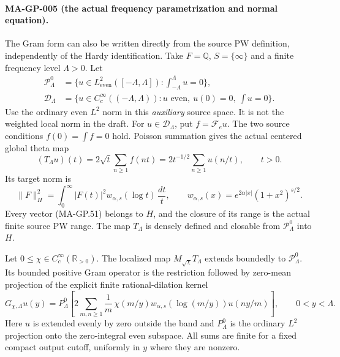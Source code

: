 \paragraph{MA-GP-005 (the actual frequency parametrization and normal equation).}
The Gram form can also be written directly from the source
PW definition, independently of the Hardy identification.
Take $F=\mathbb Q$, $S=\{\infty\}$ and a finite frequency
level $\Lambda>0$.  Let
\[
 \begin{aligned}
 \mathcal P_\Lambda^0
   &=\{u\in L^2_{\mathrm{even}}([-\Lambda,\Lambda]):
                                       \int_{-\Lambda}^{\Lambda}u=0\},\\
 \mathscr D_\Lambda
   &=\{u\in C_c^\infty((-\Lambda,\Lambda)):
                      u\text{ even},\ u(0)=0,\ \int u=0\}.
 \end{aligned}
 \tag{MA-GP.50}
\]
Use the ordinary even $L^2$ norm in this \emph{auxiliary}
source space.  It is not the weighted local norm in the draft.
For $u\in\mathscr D_\Lambda$, put $f=\mathcal F_eu$.
The two source conditions $f(0)=\int f=0$ hold.
Poisson summation gives the actual centered global theta map
\[
 (T_\Lambda u)(t)
       =2\sqrt t\sum_{n\ge1}f(nt)
       =2t^{-1/2}\sum_{n\ge1}u(n/t),\qquad t>0.
 \tag{MA-GP.51}
\]
Its target norm is
\[
 \|F\|_H^2=\int_0^\infty|F(t)|^2
           w_{\alpha,s}(\log t)\,\frac{dt}{t},
 \qquad w_{\alpha,s}(x)=e^{2\alpha|x|}(1+x^2)^{s/2}.
 \tag{MA-GP.52}
\]
Every vector (MA-GP.51) belongs to $H$, and the closure of
its range is the actual finite source PW range.
The map $T_\Lambda$ is densely defined and closable from
$\mathcal P_\Lambda^0$ into $H$.

Let $0\le\chi\in C_c^\infty(\mathbb R_{>0})$.
The localized map $M_{\sqrt\chi}T_\Lambda$ extends boundedly
to $\mathcal P_\Lambda^0$.  Its bounded positive Gram
operator is the restriction followed by zero-mean projection
of the explicit finite rational-dilation kernel
\[
 G_{\chi,\Lambda}u(y)=P_\Lambda^0\left[
 2\sum_{m,n\ge1}\frac1m\,
       \chi(m/y)w_{\alpha,s}(\log(m/y))u(ny/m)
                         \right],\qquad 0<y<\Lambda.
 \tag{MA-GP.53}
\]
Here $u$ is extended evenly by zero outside the band and
$P_\Lambda^0$ is the ordinary $L^2$ projection onto the
zero-integral even subspace.  All sums are finite for a
fixed compact output cutoff, uniformly in $y$ where they
are nonzero.

